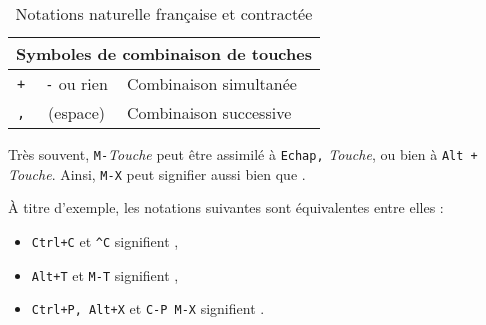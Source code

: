 \begin{table}[h!]
\begin{tabularx}{\textwidth}{| c | c | X |}
        \multicolumn{3}{|c|}{\textbf{Symboles de combinaison de touches}} \\ \hline
        \texttt{+}      & \texttt{-} ou rien &
            Combinaison simultanée \\ \hline
        \texttt{,}      & \texttt{\textvisiblespace} (espace) &
            Combinaison successive \\ \hline
      \end{tabularx}
    \caption{Notations naturelle française et contractée} \label{tab:shortcuts_symbols}
\end{table}

 Très souvent, \texttt{M-}\textit{Touche} peut être assimilé à \texttt{Echap,} \textit{Touche}, ou bien à \texttt{Alt +} \textit{Touche}. Ainsi, \texttt{M-X} peut signifier aussi bien  que .

À titre d'exemple, les notations suivantes sont équivalentes entre elles :
\begin{itemize}
    \item \texttt{Ctrl+C} et \texttt{\^{}C} signifient ,
    \item \texttt{Alt+T} et \texttt{M-T} signifient ,
    \item \texttt{Ctrl+P, Alt+X} et \texttt{C-P M-X} signifient .
\end{itemize}
